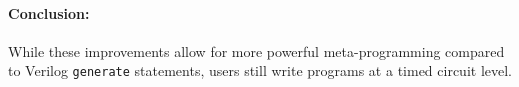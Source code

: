


\paragraph{Conclusion: } While these improvements allow for more powerful meta-programming compared to Verilog \texttt{\small{generate}} statements, users still write programs at a timed circuit level.
